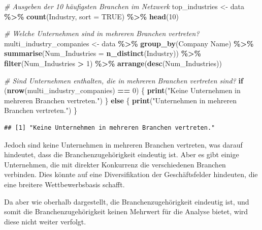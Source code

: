 \documentclass[
]{article}
\newenvironment{Shaded}{\begin{snugshade}}{\end{snugshade}}
\newcommand{\AttributeTok}[1]{\textcolor[rgb]{0.13,0.29,0.53}{#1}}
\newcommand{\CommentTok}[1]{\textcolor[rgb]{0.56,0.35,0.01}{\textit{#1}}}
\newcommand{\ConstantTok}[1]{\textcolor[rgb]{0.56,0.35,0.01}{#1}}
\newcommand{\ControlFlowTok}[1]{\textcolor[rgb]{0.13,0.29,0.53}{\textbf{#1}}}
\newcommand{\DecValTok}[1]{\textcolor[rgb]{0.00,0.00,0.81}{#1}}
\newcommand{\FunctionTok}[1]{\textcolor[rgb]{0.13,0.29,0.53}{\textbf{#1}}}
\newcommand{\NormalTok}[1]{#1}
\newcommand{\OtherTok}[1]{\textcolor[rgb]{0.56,0.35,0.01}{#1}}
\newcommand{\SpecialCharTok}[1]{\textcolor[rgb]{0.81,0.36,0.00}{\textbf{#1}}}
\newcommand{\StringTok}[1]{\textcolor[rgb]{0.31,0.60,0.02}{#1}}
\begin{document}
\begin{Shaded}
\begin{Highlighting}[]
\CommentTok{\# Ausgeben der 10 häufigsten Branchen im Netzwerk}
\NormalTok{top\_industries }\OtherTok{\textless{}{-}}\NormalTok{ data }\SpecialCharTok{\%\textgreater{}\%}
  \FunctionTok{count}\NormalTok{(Industry, }\AttributeTok{sort =} \ConstantTok{TRUE}\NormalTok{) }\SpecialCharTok{\%\textgreater{}\%}
  \FunctionTok{head}\NormalTok{(}\DecValTok{10}\NormalTok{)}

\CommentTok{\# Welche Unternehmen sind in mehreren Branchen vertreten?}
\NormalTok{multi\_industry\_companies }\OtherTok{\textless{}{-}}\NormalTok{ data }\SpecialCharTok{\%\textgreater{}\%}
  \FunctionTok{group\_by}\NormalTok{(}\StringTok{\textasciigrave{}}\AttributeTok{Company Name}\StringTok{\textasciigrave{}}\NormalTok{) }\SpecialCharTok{\%\textgreater{}\%}
  \FunctionTok{summarise}\NormalTok{(}\AttributeTok{Num\_Industries =} \FunctionTok{n\_distinct}\NormalTok{(Industry)) }\SpecialCharTok{\%\textgreater{}\%}
  \FunctionTok{filter}\NormalTok{(Num\_Industries }\SpecialCharTok{\textgreater{}} \DecValTok{1}\NormalTok{) }\SpecialCharTok{\%\textgreater{}\%}
  \FunctionTok{arrange}\NormalTok{(}\FunctionTok{desc}\NormalTok{(Num\_Industries))}

\CommentTok{\# Sind Unternehmen enthalten, die in mehreren Branchen vertreten sind?}
\ControlFlowTok{if}\NormalTok{ (}\FunctionTok{nrow}\NormalTok{(multi\_industry\_companies) }\SpecialCharTok{==} \DecValTok{0}\NormalTok{) \{}
  \FunctionTok{print}\NormalTok{(}\StringTok{"Keine Unternehmen in mehreren Branchen vertreten."}\NormalTok{)}
\NormalTok{\} }\ControlFlowTok{else}\NormalTok{ \{}
  \FunctionTok{print}\NormalTok{(}\StringTok{"Unternehmen in mehreren Branchen vertreten."}\NormalTok{)}
\NormalTok{\}}
\end{Highlighting}
\end{Shaded}

\begin{verbatim}
## [1] "Keine Unternehmen in mehreren Branchen vertreten."
\end{verbatim}

Jedoch sind keine Unternehmen in mehreren Branchen vertreten, was darauf
hindeutet, dass die Branchenzugehörigkeit eindeutig ist. Aber es gibt
einige Unternehmen, die mit direkter Konkurrenz die verschiedenen
Branchen verbinden. Dies könnte auf eine Diversifikation der
Geschäftsfelder hindeuten, die eine breitere Wettbewerbsbasis schafft.

Da aber wie oberhalb dargestellt, die Branchenzugehörigkeit eindeutig
ist, und somit die Branchenzugehörigkeit keinen Mehrwert für die Analyse
bietet, wird diese nicht weiter verfolgt.
\end{document}
